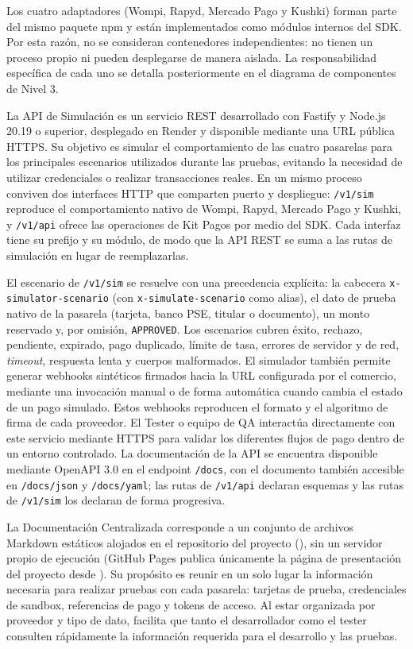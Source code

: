 Los cuatro adaptadores (Wompi, Rapyd, Mercado Pago y Kushki) forman parte del mismo paquete npm y están implementados como módulos internos del SDK. Por esta razón, no se consideran contenedores independientes: no tienen un proceso propio ni pueden desplegarse de manera aislada. La responsabilidad específica de cada uno se detalla posteriormente en el diagrama de componentes de Nivel 3.

La API de Simulación es un servicio REST desarrollado con Fastify y Node.js 20.19 o superior, desplegado en Render y disponible mediante una URL pública HTTPS. Su objetivo es simular el comportamiento de las cuatro pasarelas para los principales escenarios utilizados durante las pruebas, evitando la necesidad de utilizar credenciales o realizar transacciones reales. En un mismo proceso conviven dos interfaces HTTP que comparten puerto y despliegue: \texttt{/v1/sim} reproduce el comportamiento nativo de Wompi, Rapyd, Mercado Pago y Kushki, y \texttt{/v1/api} ofrece las operaciones de Kit Pagos por medio del SDK. Cada interfaz tiene su prefijo y su módulo, de modo que la API REST se suma a las rutas de simulación en lugar de reemplazarlas.

El escenario de \texttt{/v1/sim} se resuelve con una precedencia explícita: la cabecera \texttt{x-simulator-scenario} (con \texttt{x-simulate-scenario} como alias), el dato de prueba nativo de la pasarela (tarjeta, banco PSE, titular o documento), un monto reservado y, por omisión, \texttt{APPROVED}. Los escenarios cubren éxito, rechazo, pendiente, expirado, pago duplicado, límite de tasa, errores de servidor y de red, \textit{timeout}, respuesta lenta y cuerpos malformados. El simulador también permite generar webhooks sintéticos firmados hacia la URL configurada por el comercio, mediante una invocación manual o de forma automática cuando cambia el estado de un pago simulado. Estos webhooks reproducen el formato y el algoritmo de firma de cada proveedor. El Tester o equipo de QA interactúa directamente con este servicio mediante HTTPS para validar los diferentes flujos de pago dentro de un entorno controlado. La documentación de la API se encuentra disponible mediante OpenAPI 3.0 en el endpoint \texttt{/docs}, con el documento también accesible en \texttt{/docs/json} y \texttt{/docs/yaml}; las rutas de \texttt{/v1/api} declaran esquemas y las rutas de \texttt{/v1/sim} los declaran de forma progresiva.

La Documentación Centralizada corresponde a un conjunto de archivos Markdown estáticos alojados en el repositorio del proyecto (), sin un servidor propio de ejecución (GitHub Pages publica únicamente la página de presentación del proyecto desde ). Su propósito es reunir en un solo lugar la información necesaria para realizar pruebas con cada pasarela: tarjetas de prueba, credenciales de sandbox, referencias de pago y tokens de acceso. Al estar organizada por proveedor y tipo de dato, facilita que tanto el desarrollador como el tester consulten rápidamente la información requerida para el desarrollo y las pruebas.

